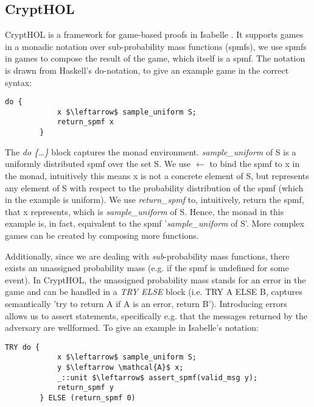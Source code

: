 \subsection{CryptHOL}
CryptHOL is a framework for game-based proofs in Isabelle \parencite{CryptHOL_game_based}. It supports games in a monadic notation over sub-probability mass functions (spmfs), we use spmfs in games to compose the result of the game, which itself is a spmf. The notation is drawn from Haskell's do-notation, to give an example game
in the correct syntax:

\begin{example}
    \hspace{0mm}
    \begin{lstlisting}[language=isabelle]
        do {
            x $\leftarrow$ sample_uniform S;
            return_spmf x
        }
    \end{lstlisting}

    The \textit{do \{\dots\}} block captures the monad environment.
    \textit{sample\_uniform} of S is a uniformly distributed spmf over the set S. 
    We use $\leftarrow$ to bind the spmf to x in the monad, intuitively this means x is not a concrete element of S, but represents any element of S with respect to the probability distribution of the spmf (which in the example is uniform).
    We use \textit{return\_spmf} to, intuitively, return the spmf, that x represents, which is \textit{sample\_uniform} of S. Hence, the monad in this example is, in fact, equivalent to the spmf '\textit{sample\_uniform} of S'.
    More complex games can be created by composing more functions.
\end{example}

Additionally, since we are dealing with \textit{sub}-probability mass functions, 
there exists an unassigned probability mass (e.g. if the spmf is undefined for some event). 
In CryptHOL, the unassigned probability mass stands for an error in the game and can be handled in a \textit{TRY ELSE} block (i.e. TRY A ELSE B, captures semantically 'try to return A if A is an error, return B'). 
Introducing errors allows us to assert statements, specifically e.g. that 
the messages returned by the adversary are wellformed.
To give an example in Isabelle's notation: 
\begin{example}
    \hspace{0mm}
    \begin{lstlisting}[language=isabelle]
        TRY do {
            x $\leftarrow$ sample_uniform S;
            y $\leftarrow \mathcal{A}$ x;
            _::unit $\leftarrow$ assert_spmf(valid_msg y);
            return_spmf y
        } ELSE (return_spmf 0)
    \end{lstlisting}
\end{example}

